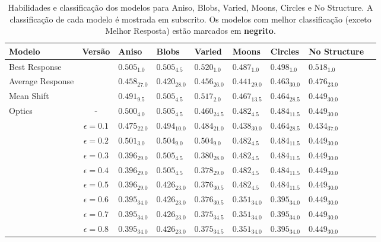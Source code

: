 \begin{table}[!t]
    \centering
    \tiny
    \caption{Habilidades e classificação dos modelos para Aniso, Blobs, Varied, Moons, Circles e No Structure. A classificação de cada modelo é mostrada em subscrito. Os modelos com melhor classificação (exceto Melhor Resposta) estão marcados em \textbf{negrito}.}
        \begin{tabular}{l|c|lllllll}
\midrule
Modelo & Versão & Aniso & Blobs & Varied & Moons & Circles & No Structure \\
\midrule
Best Response &  & $0.505_{1.0}$ & $0.505_{4.5}$ & $0.520_{1.0}$ & $0.487_{1.0}$ & $0.498_{1.0}$ & $0.518_{1.0}$ \\
\midrule
Average Response &  & $0.458_{27.0}$ & $0.420_{28.0}$ & $0.456_{26.0}$ & $0.441_{29.0}$ & $0.463_{30.0}$ & $0.476_{23.0}$ \\
\midrule
Mean Shift &  & $0.491_{9.5}$ & $\mathbf{0.505_{4.5}}$ & $\mathbf{0.517_{2.0}}$ & $0.467_{13.5}$ & $0.464_{28.5}$ & $0.449_{30.0}$ \\
\midrule
\multirow[t]{6}{*}{Optics} & - & $0.500_{4.0}$ & $\mathbf{0.505_{4.5}}$  & $0.460_{24.5}$  & $\mathbf{0.482_{4.5}}$ & $0.484_{11.5}$  & $0.449_{30.0}$ \\
\midrule
\multirow[t]{9}{*}{DBSCAN} & $\epsilon=0.1$ & $0.475_{22.0}$ & $0.494_{10.0}$ & $0.484_{21.0}$ & $0.438_{30.0}$ & $0.464_{28.5}$ & $0.434_{37.0}$ \\
 & $\epsilon=0.2$ & $0.501_{3.0}$ & $0.504_{9.0}$ & $0.504_{9.0}$ & $\mathbf{0.482_{4.5}}$ & $0.484_{11.5}$ & $0.449_{30.0}$ \\
 & $\epsilon=0.3$ & $0.396_{29.0}$ & $\mathbf{0.505_{4.5}}$ & $0.380_{28.0}$ & $\mathbf{0.482_{4.5}}$ & $0.484_{11.5}$ & $0.449_{30.0}$ \\
 & $\epsilon=0.4$ & $0.396_{29.0}$ & $\mathbf{0.505_{4.5}}$ & $0.378_{29.0}$ & $\mathbf{0.482_{4.5}}$ & $0.484_{11.5}$ & $0.449_{30.0}$ \\
 & $\epsilon=0.5$ & $0.396_{29.0}$ & $0.426_{23.0}$ & $0.376_{30.5}$ & $\mathbf{0.482_{4.5}}$ & $0.484_{11.5}$ & $0.449_{30.0}$ \\
 & $\epsilon=0.6$ & $0.395_{34.0}$ & $0.426_{23.0}$ & $0.376_{30.5}$ & $0.351_{34.0}$ & $0.395_{34.0}$ & $0.449_{30.0}$ \\
 & $\epsilon=0.7$ & $0.395_{34.0}$ & $0.426_{23.0}$ & $0.375_{34.5}$ & $0.351_{34.0}$ & $0.395_{34.0}$ & $0.449_{30.0}$ \\
 & $\epsilon=0.8$ & $0.395_{34.0}$ & $0.426_{23.0}$ & $0.375_{34.5}$ & $0.351_{34.0}$ & $0.395_{34.0}$ & $0.449_{30.0}$ \\

\end{tabular}
\end{table}
